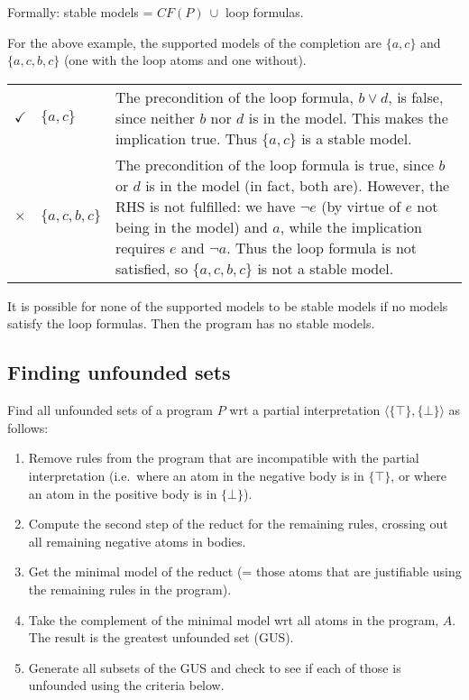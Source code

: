 \documentclass[9pt,a4paper,landscape]{article}
\begin{document}
{\vspace{\baselineskip}

Formally: stable models = $CF(P)\ \cup$ loop formulas.

\vspace{\baselineskip}

For the above example, the supported models of the completion are $\{a, c\}$ and $\{a, c, b, c\}$ (one with the loop atoms and one without).

\begin{center}
	\begin{tabular}{llp{20cm}}
		$\checkmark$ & $\{a, c\}$ & The precondition of the loop formula, $b \lor d$, is false, since neither $b$ nor $d$ is in the model. This makes the implication true. Thus $\{a, c\}$ is a stable model. \\
		$\times$ & $\{a, c, b, c\}$ & The precondition of the loop formula is true, since $b$ or $d$ is in the model (in fact, both are). However, the RHS is not fulfilled: we have $\neg e$ (by virtue of $e$ not being in the model) and $a$, while the implication requires $e$ and $\neg a$. Thus the loop formula is not satisfied, so $\{a, c, b, c\}$ is not a stable model.\\
	\end{tabular}
\end{center}

It is possible for none of the supported models to be stable models if no models satisfy the loop formulas. Then the program has no stable models.

\pagebreak


\subsection{Finding unfounded sets}
\label{subsec:unf}

Find all unfounded sets of a program $P$ wrt a partial interpretation $\langle \{\top\}, \{\bot\} \rangle$ as follows:
\begin{enumerate}[noitemsep]
	\item Remove rules from the program that are incompatible with the partial interpretation (i.e.\ where an atom in the negative body is in $\{\top\}$, or where an atom in the positive body is in $\{\bot\}$).
	\item Compute the second step of the reduct for the remaining rules, crossing out all remaining negative atoms in bodies.
	\item Get the minimal model of the reduct (= those atoms that are justifiable using the remaining rules in the program).
	\item Take the complement of the minimal model wrt all atoms in the program, $A$. The result is the greatest unfounded set (GUS).
	\item Generate all subsets of the GUS and check to see if each of those is unfounded using the criteria below.
\end{enumerate}

}
\end{document}
